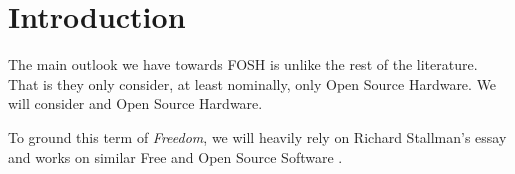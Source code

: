 \documentclass[acmtog]{acmart}
\begin{document}




\maketitle

\section{Introduction}
The main outlook we have towards FOSH is unlike the rest of the literature. 
That is they only consider, at least nominally, only Open Source Hardware. 
We will consider  and Open Source Hardware. 

To ground this term of \textit{Freedom}, 
we will heavily rely on Richard Stallman's essay and works on similar Free and Open Source Software \cite{b0_stallman}.
\end{document}
